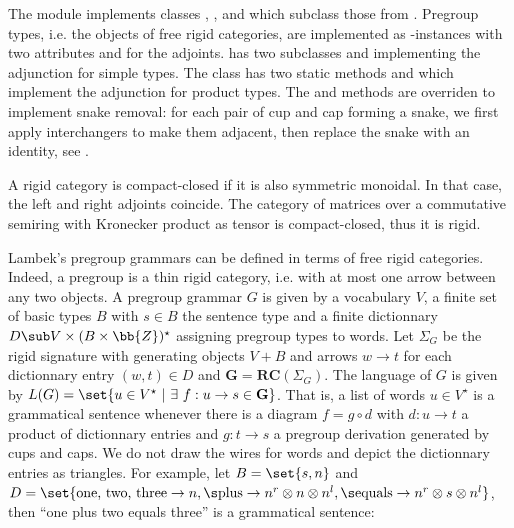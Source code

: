 The  module implements classes , ,  and  which subclass those from .
Pregroup types, i.e. the objects of free rigid categories, are implemented as -instances  with two attributes  and  for the adjoints.
 has two subclasses  and  implementing the adjunction for simple types.
The  class has two static methods  and  which implement the adjunction for product types.
The  and  methods are overriden to implement snake removal: for each pair of cup and cap forming a snake, we first apply interchangers to make them adjacent, then replace the snake with an identity, see \cite[Definition 2.12]{DunnVicary19}.

\begin{example}
A rigid category is compact-closed if it is also symmetric monoidal.
In that case, the left and right adjoints coincide.
The category of matrices over a commutative semiring with Kronecker product as tensor is compact-closed, thus it is rigid.
\end{example}

\begin{example}\label{example-pregroup}
Lambek's pregroup grammars \cite{Lambek99,Lambek01,Lambek08} can be defined in terms of free rigid categories.
Indeed, a pregroup is a thin rigid category, i.e. with at most one arrow between any two objects.
A pregroup grammar $G$ is given by a vocabulary $V$, a finite set of basic types $B$ with $s \in B$ the sentence type and a finite dictionnary $D \sub V \times (B \times \bb{Z})^\star$ assigning pregroup types to words.
Let $\Sigma_G$ be the rigid signature with generating objects $V + B$ and arrows $w \to t$ for each dictionnary entry $(w, t) \in D$ and $\mathbf{G} = \mathbf{RC}(\Sigma_G)$.
The language of $G$ is given by $L(G) = \set{u \in V^\star \ \vert \ \exists \ f : u \to s \in \mathbf{G}}$.
That is, a list of words $u \in V^\star$ is a grammatical sentence whenever there is a diagram $f = g \circ d$ with $d : u \to t$ a product of dictionnary entries and $g : t \to s$ a pregroup derivation generated by cups and caps.
We do not draw the wires for words and depict the dictionnary entries as triangles. For example, let $B = \set{s, n}$ and $D = \set{\text{one, two, three} \to n, \s \text{plus} \to n^r \otimes n \otimes n^l, \s \text{equals} \to n^r \otimes s \otimes n^l}$, then ``one plus two equals three'' is a grammatical sentence:
\begin{center}

\end{center}
\end{example}

